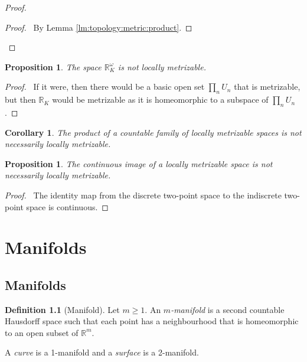 \documentclass{report}
\let\qed\relax
\newtheorem{prop}[lm]{Proposition}
\newtheorem{cor}{Corollary}[lm]
\theoremstyle{definition}
\newtheorem{df}[lm]{Definition}
\begin{document}
\begin{proof}
  \pf
  \begin{proof}
    \pf\ By Lemma \ref{lm:topology:metric:product}.
  \end{proof}
  \qed
\end{proof}

\begin{prop}
  The space $\mathbb{R}_K^\omega$ is not locally metrizable.
\end{prop}

\begin{proof}
  \pf\ If it were, then there would be a basic open set $\prod_n U_n$ that is metrizable, but then $\mathbb{R}_K$ would be metrizable as it is homeomorphic to a subspace of $\prod_n U_n$. \qed
\end{proof}

\begin{cor}
  The product of a countable family of locally metrizable spaces is not necessarily locally metrizable.
\end{cor}

\begin{prop}
  The continuous image of a locally metrizable space is not necessarily locally metrizable.
\end{prop}

\begin{proof}
  \pf\ The identity map from the discrete two-point space to the indiscrete two-point space is continuous. \qed
\end{proof}

 \chapter{Manifolds}

 \section{Manifolds}

  \begin{df}[Manifold]
   Let $m \geq 1$. An \emph{$m$-manifold} is a second countable Hausdorff space
such that each point has a neighbourhood that is homeomorphic to an open subset
of $\mathbb{R}^m$.

A \emph{curve} is a 1-manifold and a \emph{surface} is a 2-manifold.
 \end{df}
\end{document}
